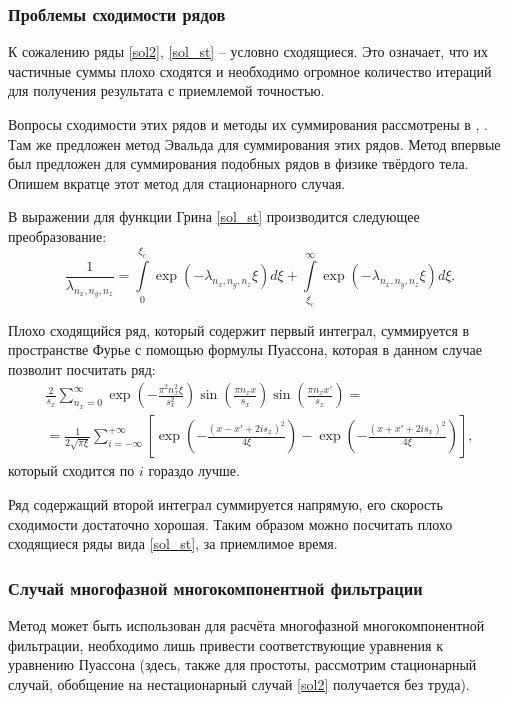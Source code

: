 \subsubsection{Проблемы сходимости рядов}
	К сожалению ряды \eqref{sol2}, \eqref{sol_st} -- условно сходящиеся. Это означает, что их частичные суммы плохо сходятся и необходимо огромное количество итераций для получения результата с приемлемой точностью.

	Вопросы сходимости этих рядов и методы их суммирования рассмотрены в \cite{posv1}, \cite{posv2}.
	Там же предложен метод Эвальда для суммирования этих рядов.
	Метод впервые был предложен для суммирования подобных рядов в физике твёрдого тела.
	Опишем вкратце этот метод для стационарного случая.

	В выражении для функции Грина \eqref{sol_st} производится следующее преобразование:
\begin{equation}
	\label{transformation1}
	\frac{1}{\lambda_{n_x, n_y, n_z}} =
	\int\limits_{0}^{\xi_c}\exp(-\lambda_{n_x, n_y, n_z}\xi)d\xi+
	\int\limits_{\xi_c}^{\infty}\exp(-\lambda_{n_x, n_y, n_z}\xi)d\xi.
\end{equation}

	Плохо сходящийся ряд, который содержит первый интеграл, суммируется в пространстве Фурье с помощью формулы Пуассона, которая в данном случае позволит посчитать ряд:
\begin{multline}
	\label{statement}
	\frac{2}{s_x}\sum\limits_{n_x=0}^{\infty} \exp\left(-\frac{\pi^2 n_x^2 \xi}{s_x^2}\right)\sin\left(\frac{\pi n_x x}{s_x}\right)\sin\left(\frac{\pi n_x x'}{s_x}\right) =\\
	=\frac{1}{2\sqrt{\pi \xi}}\sum\limits_{i = -\infty}^{+\infty}\left[\exp\left(-\frac{(x-x'+2is_x)^2}{4\xi}\right)-\exp\left(-\frac{(x+x'+2is_x)^2}{4\xi}\right)\right],
\end{multline}
	который сходится по $i$ гораздо лучше.

	Ряд содержащий второй интеграл суммируется напрямую, его скорость сходимости достаточно хорошая.
	Таким образом можно посчитать плохо сходящиеся ряды вида \eqref{sol_st}, за приемлимое время.

\subsubsection{Случай многофазной многокомпонентной фильтрации}
	Метод может быть использован для расчёта многофазной многокомпонентной фильтрации, 
	необходимо лишь привести соответствующие уравнения к уравнению Пуассона (здесь, также для простоты, рассмотрим стационарный случай, обобщение на нестационарный случай \eqref{sol2} получается без труда).

